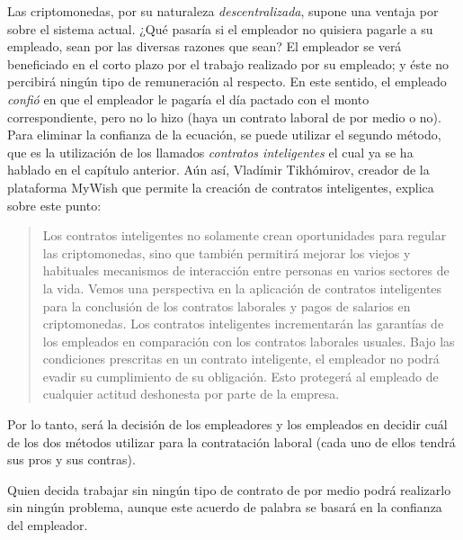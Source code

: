\documentclass[12pt,a4paper,twoside]{book}
\begin{document}
Las criptomonedas, por su naturaleza \textit{descentralizada}, supone una ventaja por sobre el sistema actual. ¿Qué pasaría si el empleador no quisiera pagarle a su empleado, sean por las diversas razones que sean? El empleador se verá beneficiado en el corto plazo por el trabajo realizado por su empleado; y éste no percibirá ningún tipo de remuneración al respecto. En este sentido, el empleado \textit{confió} en que el empleador le pagaría el día pactado con el monto correspondiente, pero no lo hizo (haya un contrato laboral de por medio o no). Para eliminar la confianza de la ecuación, se puede utilizar el segundo método, que es la utilización de los llamados \textit{contratos inteligentes} el cual ya se ha hablado en el capítulo anterior. Aún así, Vladímir Tikhómirov, creador de la plataforma MyWish que permite la creación de contratos inteligentes, explica sobre este punto:

\begin{quotation}
Los contratos inteligentes no solamente crean oportunidades para regular las criptomonedas, sino que también permitirá mejorar los viejos y habituales mecanismos de interacción entre personas en varios sectores de la vida. Vemos una perspectiva en la aplicación de contratos inteligentes para la conclusión de los contratos laborales y pagos de salarios en criptomonedas. Los contratos inteligentes incrementarán las garantías de los empleados en comparación con los contratos laborales usuales. Bajo las condiciones prescritas en un contrato inteligente, el empleador no podrá evadir su cumplimiento de su obligación. Esto protegerá al empleado de cualquier actitud deshonesta por parte de la empresa. \cite{smartcontracts:contratoslaborales}
\end{quotation}

Por lo tanto, será la decisión de los empleadores y los empleados en decidir cuál de los dos métodos utilizar para la contratación laboral (cada uno de ellos tendrá sus pros y sus contras).

Quien decida trabajar sin ningún tipo de contrato de por medio podrá realizarlo sin ningún problema, aunque este acuerdo de palabra se basará en la confianza del empleador.
\end{document}
